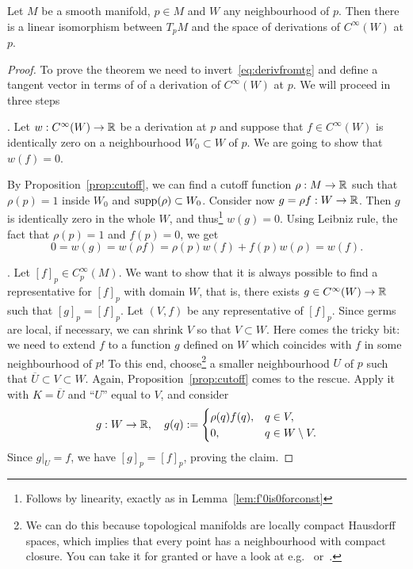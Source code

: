 \begin{proposition}
  Let $M$ be a smooth manifold, $p\in M$ and $W$ any neighbourhood of $p$.
  Then there is a linear isomorphism between $T_p M$ and the space of derivations of $C^\infty(W)$ at $p$.
\end{proposition}
\begin{proof}
  To prove the theorem we need to invert~\eqref{eq:derivfromtg} and define a tangent vector in terms of of a derivation of $C^\infty(W)$ at $p$.
  We will proceed in three steps

  . Let $w:C^\infty(W) \to\mathbb{R}$ be a derivation at $p$ and suppose that $f\in C^\infty(W)$ is identically zero on a neighbourhood $W_0\subset W$ of $p$. We are going to show that $w(f)=0$.

  By Proposition~\ref{prop:cutoff}, we can find a cutoff function $\rho:M\to\mathbb{R}$ such that $\rho(p)=1$ inside $W_0$ and $\operatorname{supp}(\rho) \subset W_0$. Consider now $g = \rho f : W \to \mathbb{R}$. Then $g$ is identically zero in the whole $W$, and thus\footnote{Follows by linearity, exactly as in Lemma~\ref{lem:f'0is0forconst}} $w(g) = 0$. Using Leibniz rule, the fact that $\rho(p)=1$ and $f(p) = 0$, we get
  \begin{equation}
    0 = w(g) = w(\rho f) = \rho(p) w(f) + f(p)w(\rho) = w(f).
  \end{equation}

  .
  Let $[f]_p\in C_p^\infty(M)$.
  We want to show that it is always possible to find a representative for $[f]_p$ with domain $W$, that is, there exists $g\in C^\infty(W)\to\mathbb{R}$ such that $[g]_p = [f]_p$.
  Let $(V, f)$ be any representative of $[f]_p$.
  Since germs are local, if necessary, we can shrink $V$ so that $V\subset W$.
  Here comes the tricky bit: we need to extend $f$ to a function $g$ defined on $W$ which coincides with $f$ in some neighbourhood of $p$!
  To this end, choose\footnote{We can do this because topological manifolds are locally compact Hausdorff spaces, which implies that every point has a neighbourhood with compact closure. You can take it for granted or have a look at e.g.~\cite[Lemma 4.65]{book:lee:topology} or~\cite{book:munkres:topology}.} a smaller neighbourhood $U$ of $p$ such that $\overline{U}\subset V\subset W$.
  Again, Proposition~\ref{prop:cutoff} comes to the rescue. Apply it with $K=\overline{U}$ and ``$U$'' equal to $V$, and consider
  \begin{equation}
    g:W\to\mathbb{R}, \quad
    g(q) := \begin{cases}
      \rho(q)f(q), & q\in V,\\
      0, & q \in W\setminus V.
    \end{cases}
  \end{equation}
  Since $g|_U = f$, we have $[g]_p = [f]_p$, proving the claim.


\end{proof}
